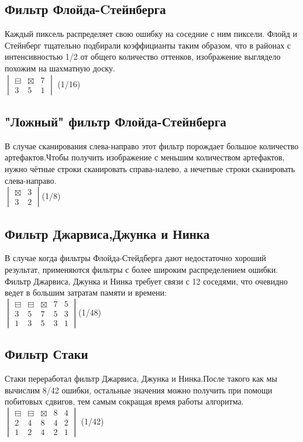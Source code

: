 \subsection{Фильтр Флойда-Cтейнберга }
Каждый пиксель распределяет свою ошибку на соседние с ним пиксели. Флойд и Стейнберг тщательно  подбирали коэффицианты таким образом, что в районах с  интенсивностью 1/2 от общего количество оттенков, изображение выглядело похожим на шахматную доску.\\
$  \begin{vmatrix}
\boxminus & \boxtimes & 7\\
3 & 5 & 1
\end{vmatrix}$ (1/16)
\subsection{"Ложный"  фильтр Флойда-Стейнберга }
В случае сканирования слева-направо этот фильтр порождает большое количество артефактов.Чтобы получить изображение с меньшим количеством артефактов, нужно чётные строки сканировать справа-налево, а нечетные строки сканировать слева-направо.\\
$\begin{vmatrix}
\boxtimes & 3 \\
3 & 2 
\end{vmatrix} $(1/8)

\subsection{Фильтр Джарвиса,Джунка и Нинка}
В случае когда фильтры Флойда-Стейдберга дают недостаточно хороший результат, применяются фильтры с более широким распределением ошибки. Фильтр Джарвиса, Джунка и Нинка требует связи с 12 соседями, что очевидно ведет в большим затратам памяти и времени\cite{Dh}:\\
$\begin{vmatrix}
\boxminus & \boxminus & \boxtimes & 7 & 5\\
3 & 5 & 7 & 5 &3 \\
1 & 3 & 5 & 3 & 1 
\end{vmatrix}$(1/48)

\subsection{Фильтр Стаки}
Стаки переработал фильтр Джарвиса, Джунка и Нинка.После такого как мы вычислим 8/42 ошибки, остальные значения можно получить при помощи побитовых сдвигов, тем самым сокращая время работы алгоритма.\\
$\begin{vmatrix}
\boxminus & \boxminus & \boxtimes & 8 & 4 \\
2 & 4 & 8 & 4 & 2 \\
1 & 2 & 4 & 2 & 1

\end{vmatrix}$ (1/42)

